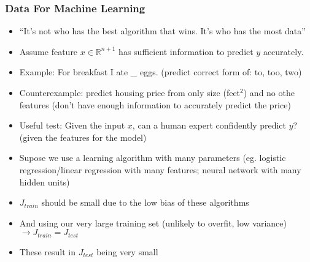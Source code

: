 \subsubsection{Data For Machine Learning}
\begin{itemize}[--]
	\item ``It's not who has the best algorithm that wins. It's who has the most data''
	\item Assume feature $x\in\mathbb{R}^{n+1}$ has sufficient information to predict $y$ accurately.
	\item Example: For breakfast I ate \_ eggs. (predict correct form of: to, too, two)
	\item Counterexample: predict housing price from only size (feet$^2$) and no othe features (don't have enough information to accurately predict the price)
	\item Useful test: Given the input $x$, can a human expert confidently predict $y$? (given the features for the model)
	\item Supose we use a learning algorithm with many parameters (eg. logistic regression/linear regression with many features; neural network with many hidden units)
	\item $J_{train}$ should be small due to the low bias of these algorithms
	\item And using our very large training set (unlikely to overfit, low variance) $\to J_{train}=J_{test}$
	\item These result in $J_{test}$ being very small
\end{itemize}

